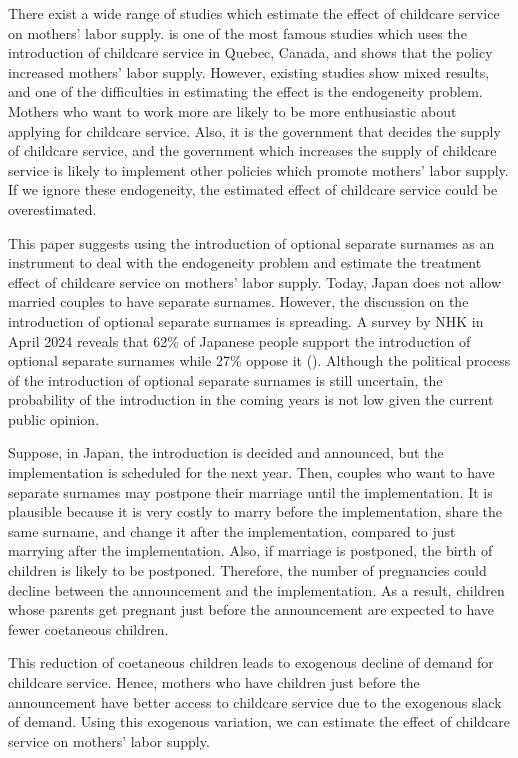 \documentclass[12pt]{article}
\begin{document}
There exist a wide range of studies which estimate the effect of childcare service on mothers' labor supply.
\cite{Baker2008-vt} is one of the most famous studies which uses the introduction of childcare service in Quebec, Canada, and shows that the policy increased mothers' labor supply.
However, existing studies show mixed results, and one of the difficulties in estimating the effect is the endogeneity problem.
Mothers who want to work more are likely to be more enthusiastic about applying for childcare service.
Also, it is the government that decides the supply of childcare service, and the government which increases the supply of childcare service is likely to implement other policies which promote mothers' labor supply.
If we ignore these endogeneity, the estimated effect of childcare service could be overestimated.


This paper suggests using the introduction of optional separate surnames as an instrument to deal with the endogeneity problem and estimate the treatment effect of childcare service on mothers' labor supply.
Today, Japan does not allow married couples to have separate surnames.
However, the discussion on the introduction of optional separate surnames is spreading.
A survey by NHK in April 2024 reveals that 62\% of Japanese people support the introduction of optional separate surnames while 27\% oppose it (\cite{nhk}).
Although the political process of the introduction of optional separate surnames is still uncertain, the probability of the introduction in the coming years is not low given the current public opinion.


Suppose, in Japan, the introduction is decided and announced, but the implementation is scheduled for the next year.
Then, couples who want to have separate surnames may postpone their marriage until the implementation. 
It is plausible because it is very costly to marry before the implementation, share the same surname, and change it after the implementation, compared to just marrying after the implementation.
Also, if marriage is postponed, the birth of children is likely to be postponed.
Therefore, the number of pregnancies could decline between the announcement and the implementation.
As a result, children whose parents get pregnant just before the announcement are expected to have fewer coetaneous children.


This reduction of coetaneous children leads to exogenous decline of demand for childcare service.
Hence, mothers who have children just before the announcement have better access to childcare service due to the exogenous slack of demand.
Using this exogenous variation, we can estimate the effect of childcare service on mothers' labor supply. 
\end{document}
